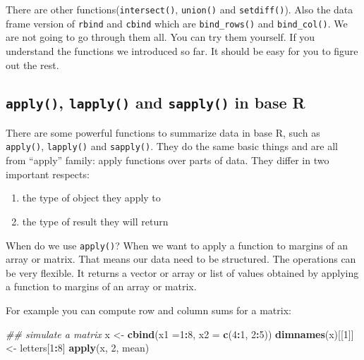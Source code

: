 \documentclass[12pt,]{krantz}
\makeatletter
\newenvironment{Shaded}{\begin{snugshade}}{\end{snugshade}}
\newcommand{\CommentTok}[1]{\textcolor[rgb]{0.37,0.37,0.37}{\textit{#1}}}
\newcommand{\DataTypeTok}[1]{\textcolor[rgb]{0.27,0.27,0.27}{#1}}
\newcommand{\DecValTok}[1]{\textcolor[rgb]{0.06,0.06,0.06}{#1}}
\newcommand{\KeywordTok}[1]{\textcolor[rgb]{0.27,0.27,0.27}{\textbf{#1}}}
\newcommand{\NormalTok}[1]{#1}
\newcommand{\OperatorTok}[1]{\textcolor[rgb]{0.43,0.43,0.43}{\textbf{#1}}}
\newcommand{\StringTok}[1]{\textcolor[rgb]{0.5,0.5,0.5}{#1}}
\providecommand{\tightlist}{%
  \setlength{\itemsep}{0pt}\setlength{\parskip}{0pt}}
\newenvironment{kframe}{%
\medskip{}
\setlength{\fboxsep}{.8em}
 \def\at@end@of@kframe{}%
 \ifinner\ifhmode%
  \def\at@end@of@kframe{\end{minipage}}%
  \begin{minipage}{\columnwidth}%
 \fi\fi%
 \def\FrameCommand##1{\hskip\@totalleftmargin \hskip-\fboxsep
 \colorbox{shadecolor}{##1}\hskip-\fboxsep
     \hskip-\linewidth \hskip-\@totalleftmargin \hskip\columnwidth}%
 \MakeFramed {\advance\hsize-\width
   \@totalleftmargin\z@ \linewidth\hsize
   \@setminipage}}%
 {\par\unskip\endMakeFramed%
 \at@end@of@kframe}
\renewenvironment{Shaded}{\begin{kframe}}{\end{kframe}}
\makeatother
\begin{document}
There are other functions(\texttt{intersect()}, \texttt{union()} and \texttt{setdiff()}). Also the data frame version of \texttt{rbind} and \texttt{cbind} which are \texttt{bind\_rows()} and \texttt{bind\_col()}. We are not going to go through them all. You can try them yourself. If you understand the functions we introduced so far. It should be easy for you to figure out the rest.

\hypertarget{applyfamilyinbaser}{%
\subsection{\texorpdfstring{\texttt{apply()}, \texttt{lapply()} and \texttt{sapply()} in base R}{apply(), lapply() and sapply() in base R}}\label{applyfamilyinbaser}}

There are some powerful functions to summarize data in base R, such as \texttt{apply()}, \texttt{lapply()} and \texttt{sapply()}. They do the same basic things and are all from ``apply'' family: apply functions over parts of data. They differ in two important respects:

\begin{enumerate}
\def\labelenumi{\arabic{enumi}.}
\tightlist
\item
  the type of object they apply to
\item
  the type of result they will return
\end{enumerate}

When do we use \texttt{apply()}? When we want to apply a function to margins of an array or matrix. That means our data need to be structured. The operations can be very flexible. It returns a vector or array or list of values obtained by applying a function to margins of an array or matrix.

For example you can compute row and column sums for a matrix:

\begin{Shaded}
\begin{Highlighting}[]
\CommentTok{## simulate a matrix}
\NormalTok{x <-}\StringTok{ }\KeywordTok{cbind}\NormalTok{(}\DataTypeTok{x1 =}\DecValTok{1}\OperatorTok{:}\DecValTok{8}\NormalTok{, }\DataTypeTok{x2 =} \KeywordTok{c}\NormalTok{(}\DecValTok{4}\OperatorTok{:}\DecValTok{1}\NormalTok{, }\DecValTok{2}\OperatorTok{:}\DecValTok{5}\NormalTok{))}
\KeywordTok{dimnames}\NormalTok{(x)[[}\DecValTok{1}\NormalTok{]] <-}\StringTok{ }\NormalTok{letters[}\DecValTok{1}\OperatorTok{:}\DecValTok{8}\NormalTok{]}
\KeywordTok{apply}\NormalTok{(x, }\DecValTok{2}\NormalTok{, mean)}
\end{Highlighting}
\end{Shaded}
\end{document}
